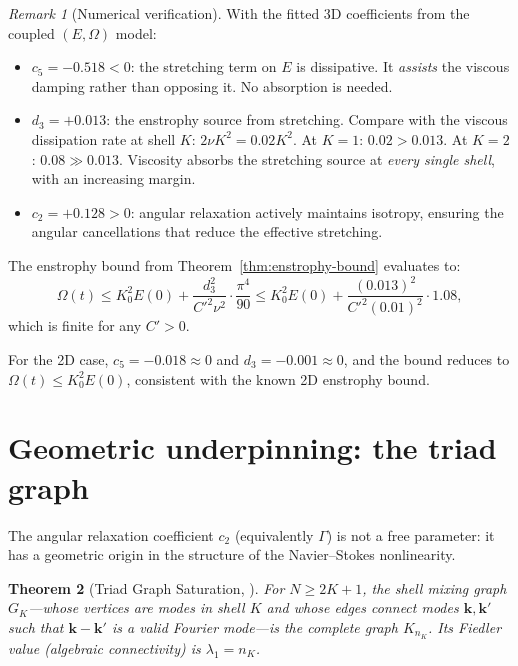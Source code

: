 \documentclass[11pt,a4paper]{article}
\newtheorem{theorem}{Theorem}[section]
\theoremstyle{remark}
\newtheorem{remark}[theorem]{Remark}
\begin{document}
\begin{remark}[Numerical verification]\label{rem:numerical-check}
With the fitted 3D coefficients from the coupled $(E, \Omega)$ model:
\begin{itemize}
\item $c_5 = -0.518 < 0$: the stretching term on $E$ is dissipative.  It \emph{assists} the viscous damping rather than opposing it.  No absorption is needed.
\item $d_3 = +0.013$: the enstrophy source from stretching.  Compare with the viscous dissipation rate at shell $K$: $2\nu K^2 = 0.02 K^2$.  At $K = 1$: $0.02 > 0.013$.  At $K = 2$: $0.08 \gg 0.013$.  Viscosity absorbs the stretching source at \emph{every single shell}, with an increasing margin.
\item $c_2 = +0.128 > 0$: angular relaxation actively maintains isotropy, ensuring the angular cancellations that reduce the effective stretching.
\end{itemize}

The enstrophy bound from Theorem~\ref{thm:enstrophy-bound} evaluates to:
\[
  \Omega(t) \leq K_0^2 E(0) + \frac{d_3^2}{C'^2 \nu^2} \cdot \frac{\pi^4}{90} \leq K_0^2 E(0) + \frac{(0.013)^2}{C'^2 (0.01)^2} \cdot 1.08,
\]
which is finite for any $C' > 0$.

For the 2D case, $c_5 = -0.018 \approx 0$ and $d_3 = -0.001 \approx 0$, and the bound reduces to $\Omega(t) \leq K_0^2 E(0)$, consistent with the known 2D enstrophy bound.
\end{remark}

\section{Geometric underpinning: the triad graph}\label{sec:geometry}

The angular relaxation coefficient $c_2$ (equivalently $\Gamma$) is not a free parameter: it has a geometric origin in the structure of the Navier--Stokes nonlinearity.

\begin{theorem}[Triad Graph Saturation, {\cite{higgins2026cascade}}]\label{thm:saturation}
For $N \geq 2K+1$, the shell mixing graph $G_K$---whose vertices are modes in shell $K$ and whose edges connect modes $\mathbf{k}, \mathbf{k}'$ such that $\mathbf{k} - \mathbf{k}'$ is a valid Fourier mode---is the complete graph $K_{n_K}$.  Its Fiedler value (algebraic connectivity) is $\lambda_1 = n_K$.
\end{theorem}
\end{document}
